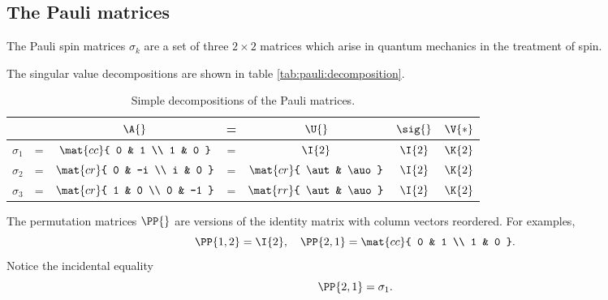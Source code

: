 \subsection{The Pauli matrices}
The Pauli spin matrices $\sigma_{k}$ are a set of three $2 \times 2$ matrices which arise in quantum mechanics in the treatment of spin.

The singular value decompositions are shown in table \eqref{tab:pauli:decomposition}.
\begin{table}[htdp]
\caption[Simple decompositions of the Pauli matrices]{Simple decompositions of the Pauli matrices.}
\begin{center}
\begin{tabular}{ccccccc}
%
 && $\A{}$ & = & $\U{}$ & $\sig{}$& $\V{*}$ \\\hline
%
 $\sigma_{1}$ & = & $\mat{cc}{ 0 & 1 \\ 1 & 0 }$  & = & $\I{2}$ &  $\I{2}$ &  $\K{2}$ \\
%
 $\sigma_{2}$ & = & $\mat{cr}{ 0 & -i \\ i & 0 }$ & = & $\mat{cr}{ \aut & \auo }$ & $\I{2}$& $\K{2}$ \\
%
 $\sigma_{3}$ & = & $\mat{cr}{ 1 & 0 \\ 0 & -1 }$ & = & $\mat{rr}{ \aut & \auo }$ & $\I{2}$ & $\K{2}$
%
\end{tabular}
\end{center}
\label{tab:pauli:decomposition}
\end{table}
%
The permutation matrices $\PP{}$ are versions of the identity matrix with column vectors reordered. For examples,
\begin{equation}
  \PP{1,2} = \I{2}, \quad \PP{2,1} = \mat{cc}{ 0 & 1 \\ 1 & 0 }.
\end{equation}
Notice the incidental equality
\begin{equation}
   \PP{2,1} = \sigma_{1}.
\end{equation}


